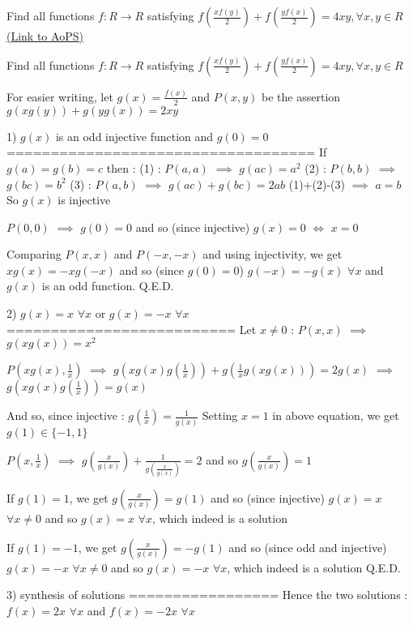 \begin{problem}
	Find all functions  $ f: R \to R $ satisfying 
$ f(\frac{xf(y)}{2})+f(\frac{yf(x)}{2})=4xy, \forall x,y \in R $
	\flushright \href{https://artofproblemsolving.com/community/c6h479408}{(Link to AoPS)}
\end{problem}



\begin{solution}
	\begin{tcolorbox}Find all functions  $ f: R \to R $ satisfying 
$ f(\frac{xf(y)}{2})+f(\frac{yf(x)}{2})=4xy, \forall x,y \in R $\end{tcolorbox}
For easier writing, let $g(x)=\frac{f(x)}2$ and $P(x,y)$ be the assertion $g(xg(y))+g(yg(x))=2xy$

1) $g(x)$ is an odd injective function and $g(0)=0$
===================================
If $g(a)=g(b)=c$ then :
(1) : $P(a,a)$ $\implies$ $g(ac)=a^2$
(2) : $P(b,b)$ $\implies$ $g(bc)=b^2$
(3) : $P(a,b)$ $\implies$ $g(ac)+g(bc)=2ab$
(1)+(2)-(3) $\implies$ $a=b$
So $g(x)$ is injective

$P(0,0)$ $\implies$ $g(0)=0$ and so (since injective) $g(x)=0$ $\iff$ $x=0$

Comparing $P(x,x)$ and $P(-x,-x)$ and using injectivity, we get $xg(x)=-xg(-x)$ and so (since $g(0)=0$) $g(-x)=-g(x)$ $\forall x$ and $g(x)$ is an odd function.
Q.E.D.

2) $g(x)=x$ $\forall x$ or $g(x)=-x$ $\forall x$
==========================
Let $x\ne 0$ :
$P(x,x)$ $\implies$ $g(xg(x))=x^2$

$P(xg(x),\frac 1x)$ $\implies$ $g(xg(x)g(\frac 1x))+g(\frac 1xg(xg(x)))=2g(x)$ $\implies$ $g(xg(x)g(\frac 1x))=g(x)$

And so, since injective : $g(\frac 1x)=\frac 1{g(x)}$
Setting $x=1$ in above equation, we get $g(1)\in\{-1,1\}$

$P(x,\frac 1x)$ $\implies$ $g(\frac x{g(x)})+\frac 1{g(\frac x{g(x)})}=2$ and so $g(\frac x{g(x)})=1$

If $g(1)=1$, we get $g(\frac x{g(x)})=g(1)$ and so (since injective) $g(x)=x$ $\forall x\ne 0$ and so $g(x)=x$ $\forall x$, which indeed is a solution

If $g(1)=-1$, we get $g(\frac x{g(x)})=-g(1)$ and so (since odd and injective) $g(x)=-x$ $\forall x\ne 0$ and so $g(x)=-x$ $\forall x$, which indeed is a solution
Q.E.D.

3) synthesis of solutions
=================
Hence the two solutions : $\boxed{f(x)=2x}$ $\forall x$ and $\boxed{f(x)=-2x}$ $\forall x$
\end{solution}



